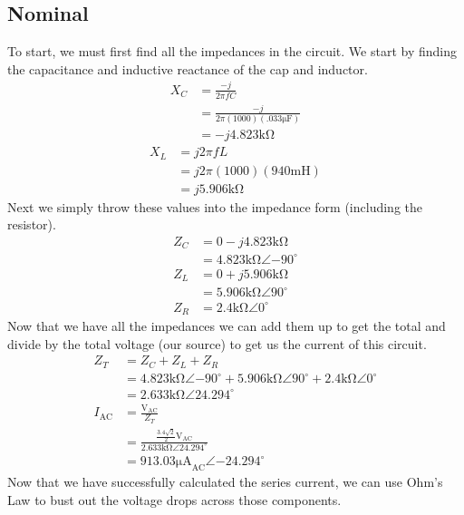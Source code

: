 \documentclass[12pt,a4paper,titlepage]{article}
\begin{document}
\subsection{Nominal}
To start, we must first find all the impedances in the circuit. We start by finding
the capacitance and inductive reactance of the cap and inductor.
\begin{align*}
  X_C &= \frac{-j}{2\pi f C} \\
  &= \frac{-j}{2\pi (1000) (.033\si{\micro \farad})} \\
  &= -j4.823\si{\kilo \ohm}
\end{align*}
\begin{align*}
  X_L &= j2\pi f L \\
  &= j2\pi (1000) (940\si{\milli \henry}) \\
  &= j5.906\si{\kilo \ohm}
\end{align*}
Next we simply throw these values into the impedance form (including the resistor).
\begin{align*}
  Z_C &= 0 - j4.823\si{\kilo \ohm} \\
  &= 4.823\si{\kilo \ohm} \angle {-90}^{\circ} \\
  Z_L &= 0 + j5.906\si{\kilo \ohm} \\
  &= 5.906\si{\kilo \ohm} \angle 90^{\circ} \\
  Z_R &= 2.4\si{\kilo \ohm} \angle 0^{\circ}
\end{align*}
Now that we have all the impedances we can add them up to get the total and divide
by the total voltage (our source) to get us the current of this circuit.
\begin{align*}
  Z_T &= Z_C + Z_L + Z_R \\
  &= 4.823\si{\kilo \ohm} \angle {-90}^{\circ} + 5.906\si{\kilo \ohm} \angle 90^{\circ} + 2.4\si{\kilo \ohm} \angle 0^{\circ} \\
  &= 2.633\si{\kilo \ohm} \angle 24.294^{\circ} \\
  I_\text{AC} &= \frac{\si{\volt}_\text{AC}}{Z_T} \\
  &= \frac{\frac{3.4\sqrt{2}}{2}\si{\volt}_\text{AC}}{2.633\si{\kilo \ohm} \angle 24.294^{\circ}} \\
  &= 913.03\si{\micro \ampere}_\text{AC} \angle {-24.294}^{\circ}
\end{align*}
Now that we have successfully calculated the series current, we can use Ohm's Law
to bust out the voltage drops across those components.
\end{document}
